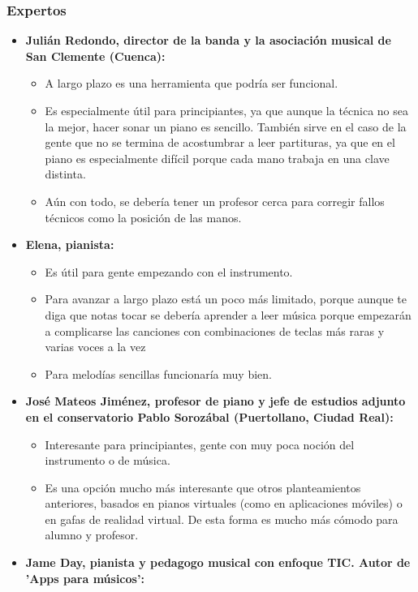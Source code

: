 \subsubsection{Expertos}
\begin{itemize}
	\item \textbf{Julián Redondo, director de la banda y la asociación
	 musical de San Clemente (Cuenca):}
	\begin{itemize}
		\item A largo plazo es una herramienta que podría
		ser funcional.
		\item Es especialmente útil para principiantes, ya que aunque
		la técnica no sea la mejor, hacer sonar un piano es sencillo.
		También sirve en el caso de la gente que no
		se termina de acostumbrar a leer partituras, ya que en el
		piano es especialmente difícil porque cada mano trabaja
		en una clave distinta.
		\item Aún con todo, se debería tener un profesor cerca para
		corregir fallos técnicos como la posición de las manos.
	\end{itemize}
	\item \textbf{Elena, pianista:}
	\begin{itemize}
		\item Es útil para gente empezando con el instrumento.
		\item Para avanzar a largo plazo está un poco más limitado,
		porque aunque te diga que notas tocar se debería aprender
		a leer música porque empezarán a complicarse las canciones
		con combinaciones de teclas más raras y varias voces a la
		vez
		\item Para melodías sencillas funcionaría muy bien.
	\end{itemize}
	\item \textbf{José Mateos Jiménez, profesor de piano y jefe de estudios adjunto
	en el conservatorio Pablo Sorozábal (Puertollano, Ciudad Real):}
	\begin{itemize}
		\item Interesante para principiantes, gente con muy poca noción del instrumento o de música.
		\item Es una opción mucho más interesante que otros planteamientos anteriores,
		basados en pianos virtuales (como en aplicaciones móviles) o en gafas de realidad virtual.
		De esta forma es mucho más cómodo para alumno y profesor.
	\end{itemize}
	\item \textbf{Jame Day, pianista y pedagogo musical con enfoque TIC. Autor de 'Apps para músicos':}

\end{itemize}
